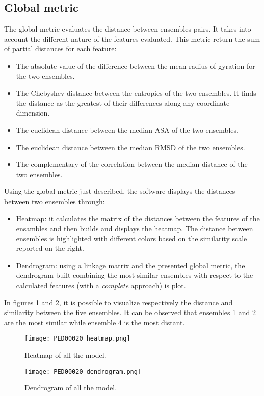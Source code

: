 \subsection{Global metric}
The global metric evaluates the distance between ensembles pairs. It takes into account the different nature of the features evaluated.
This metric return the sum of partial distances for each feature:
\begin{itemize}
\item The absolute value of the difference between the mean radius of gyration for the two ensembles.
\item The Chebyshev distance between the entropies of the two ensembles. It finds the distance as the greatest of their differences along any coordinate dimension.
\item The euclidean distance between the median ASA of the two ensembles.
\item The euclidean distance between the median RMSD of the two ensembles.
\item The complementary of the correlation between the median distance of the two ensembles.
\end{itemize}


Using the global metric just described, the software displays the distances between two ensembles through:
\begin{itemize}
\item Heatmap: it calculates the matrix of the distances between the features of the ensambles and then builds and displays the heatmap. The distance between ensembles is highlighted with different colors based on the similarity scale reported on the right. 
\item Dendrogram: using a linkage matrix and the presented global metric, the dendrogram built combining the most similar ensembles with respect to the calculated features (with a \emph{complete} approach) is plot.
\end{itemize}

In figures \ref{heatmap} and \ref{dendrogram}, it is possible to visualize respectively the distance and similarity between the five ensembles. It can be observed that ensembles 1 and 2 are the most similar while ensemble 4 is the most distant.

\begin{figure}[H]
	\begin{minipage}[b]{0.93\textwidth}
		\centering
		\texttt{[image: PED00020\_heatmap.png]}
		\caption{Heatmap of all the model.}
		\label{heatmap}
	\end{minipage}
\end{figure}
\begin{figure}[H]
	\begin{minipage}[b]{0.93\textwidth}
		\centering
		\texttt{[image: PED00020\_dendrogram.png]}
		\caption{Dendrogram of all the model.}
		\label{dendrogram}
	\end{minipage}
\end{figure}


